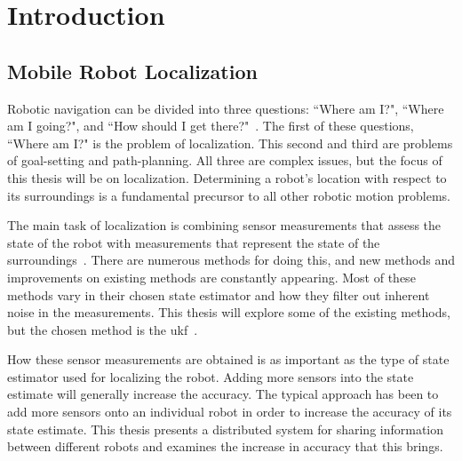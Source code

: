 \documentclass[thesis.tex]{subfile}
\begin{document}
\chapter{Introduction} \label{ch:Introduction}
\section{Mobile Robot Localization} %
Robotic navigation can be divided into three questions: ``Where am I?", ``Where am I going?", and ``How should I get there?"~\cite{Leonard1991}. The first of these questions, ``Where am I?" is the problem of localization. This second and third are problems of goal-setting and path-planning. All three are complex issues, but the focus of this thesis will be on localization. Determining a robot's location with respect to its surroundings is a fundamental precursor to all other robotic motion problems.

The main task of localization is combining sensor measurements that assess the state of the robot with measurements that represent the state of the surroundings~\cite{Roumeliotis2002}. There are numerous methods for doing this, and new methods and improvements on existing methods are constantly appearing. Most of these methods vary in their chosen state estimator and how they filter out inherent noise in the measurements. This thesis will explore some of the existing methods, but the chosen method is the \gls{ukf}~\cite{Julier1997}.

How these sensor measurements are obtained is as important as the type of state estimator used for localizing the robot. Adding more sensors into the state estimate will generally increase the accuracy. The typical approach has been to add more sensors onto an individual robot in order to increase the accuracy of its state estimate. This thesis presents a distributed system for sharing information between different robots and examines the increase in accuracy that this brings.
\end{document}
